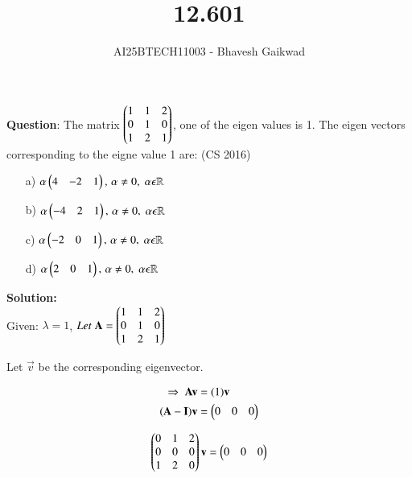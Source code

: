 \documentclass[journal]{IEEEtran}
\begin{document}

\vspace{3cm}

\title{12.601}
\author{AI25BTECH11003 - Bhavesh Gaikwad}
{\let\newpage\relax\maketitle}

\renewcommand{\thefigure}{\theenumi}
\renewcommand{\thetable}{\theenumi}
\setlength{\intextsep}{10pt} 

\renewcommand{\thetable}{\theenumi}


\textbf{Question}: 
The matrix $\begin{pmatrix}1 & 1 & 2 \\ 0 & 1 & 0 \\ 1 & 2 & 1\end{pmatrix}$, one of the eigen values is 1. The eigen vectors corresponding to the eigne value 1 are:
\hfill{(CS 2016)}\\

\begin{itemize}
    \item[a)] $\alpha\begin{pmatrix}4 & -2 & 1\end{pmatrix}, \, \alpha \neq 0, \; \alpha \epsilon \mathbb{R}$
    \item[b)] $\alpha\begin{pmatrix}-4 & 2 & 1\end{pmatrix}, \, \alpha \neq 0, \; \alpha \epsilon \mathbb{R}$
    \item[c)]$\alpha\begin{pmatrix}-2 & 0 & 1\end{pmatrix}, \, \alpha \neq 0, \; \alpha \epsilon \mathbb{R}$
    \item[d)]$\alpha\begin{pmatrix}2 & 0 & 1\end{pmatrix}, \, \alpha \neq 0, \; \alpha \epsilon \mathbb{R}$
\end{itemize}

\bigskip
 
\textbf{Solution:}\\
Given: $\lambda = 1$, $Let \; \mathbf{A} = \begin{pmatrix}1 & 1 & 2 \\ 0 & 1 & 0 \\ 1 & 2 & 1\end{pmatrix}$

Let $\vec{v}$ be the corresponding eigenvector.

\begin{align}
    \Rightarrow \; \mathbf{A}\mathbf{v} &= (1)\mathbf{v} \\ 
    (\mathbf{A} - \mathbf{I})\mathbf{v} &= \begin{pmatrix}0 & 0 & 0\end{pmatrix}
\end{align}

\begin{equation}
\begin{pmatrix}0 & 1 & 2 \\ 0 & 0 & 0 \\ 1 & 2 & 0\end{pmatrix}\mathbf{v} = \begin{pmatrix}0 & 0 & 0\end{pmatrix}    
\end{equation}
\end{document}
